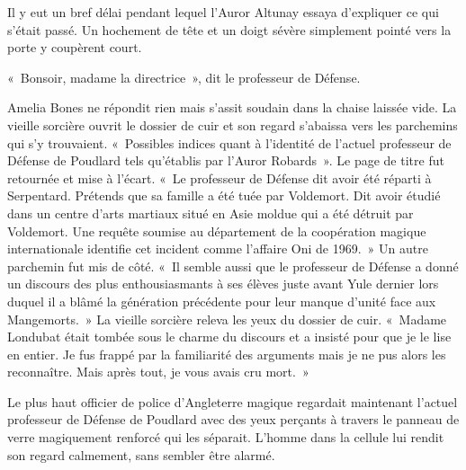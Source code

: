 Il y eut un bref délai pendant lequel l'Auror Altunay essaya d'expliquer ce qui s'était passé.
Un hochement de tête et un doigt sévère simplement pointé vers la porte y coupèrent court.

«~Bonsoir, madame la directrice~», dit le professeur de Défense.

Amelia Bones ne répondit rien mais s'assit soudain dans la chaise laissée vide.
La vieille sorcière ouvrit le dossier de cuir et son regard s'abaissa vers les parchemins qui s'y trouvaient.
«~Possibles indices quant à l'identité de l'actuel professeur de Défense de Poudlard tels qu'établis par l'Auror Robards~».
Le page de titre fut retournée et mise à l'écart.
«~Le professeur de Défense dit avoir été réparti à Serpentard.
Prétends que sa famille a été tuée par Voldemort.
Dit avoir étudié dans un centre d'arts martiaux situé en Asie moldue qui a été détruit par Voldemort.
Une requête soumise au département de la coopération magique internationale identifie cet incident comme l'affaire Oni de 1969.~»
Un autre parchemin fut mis de côté.
«~Il semble aussi que le professeur de Défense a donné un discours des plus enthousiasmants à ses élèves juste avant Yule dernier lors duquel il a blâmé la génération précédente pour leur manque d'unité face aux Mangemorts.~»
La vieille sorcière releva les yeux du dossier de cuir.
«~Madame Londubat était tombée sous le charme du discours et a insisté pour que je le lise en entier.
Je fus frappé par la familiarité des arguments mais je ne pus alors les reconnaître.
Mais après tout, je vous avais cru mort.~»

Le plus haut officier de police d'Angleterre magique regardait maintenant l'actuel professeur de Défense de Poudlard avec des yeux perçants à travers le panneau de verre magiquement renforcé qui les séparait.
L'homme dans la cellule lui rendit son regard calmement, sans sembler être alarmé.

